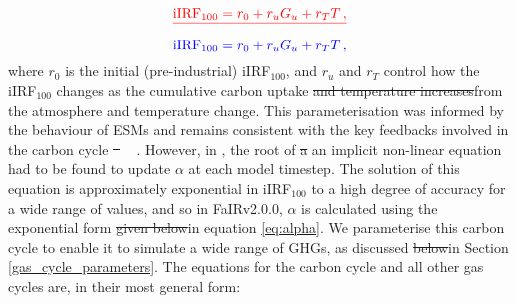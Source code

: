 \documentclass[gmd, manuscript]{copernicus}
\providecommand{\DIFadd}[1]{{\protect\color{blue}#1}} %
\providecommand{\DIFdel}[1]{{\protect\color{red}\sout{#1}}}                      %
\providecommand{\DIFaddbegin}{} %
\providecommand{\DIFaddend}{} %
\providecommand{\DIFdelbegin}{} %
\providecommand{\DIFdelend}{} %
\begin{document}
\DIFdelbegin \begin{displaymath}\DIFdel{\mathrm{iIRF_{100}} = r_0 + r_u G_u + r_T T\,,}\end{displaymath} %
\DIFdelend \DIFaddbegin \begin{equation}
    \DIFadd{\mathrm{iIRF_{100}} = r_0 + r_u G_u + r_T T\,,
}\end{equation}
\DIFaddend where $r_0$ is the initial (pre-industrial) iIRF$_{100}$, and $r_u$ and $r_T$ control how the iIRF$_{100}$ changes as the cumulative carbon uptake \DIFdelbegin \DIFdel{and temperature increases}\DIFdelend \DIFaddbegin \DIFadd{from the atmosphere and temperature change}\DIFaddend . This parameterisation was informed by the behaviour of ESMs and remains consistent with the key feedbacks involved in the carbon cycle \DIFdelbegin \DIFdel{\mbox{%
\citep{Arora2019}}\hspace{0pt}%
}\DIFdelend \DIFaddbegin \DIFadd{\mbox{%
\citep{K.Arora2020}}\hspace{0pt}%
}\DIFaddend . However, in \citet{Millar2016}, the root of \DIFdelbegin \DIFdel{a }\DIFdelend \DIFaddbegin \DIFadd{an implicit }\DIFaddend non-linear equation had to be found to update $\alpha$ at each model timestep. The solution of this equation is approximately exponential in iIRF$_{100}$ to a high degree of accuracy for a wide range of values\DIFaddbegin \DIFadd{, }\DIFaddend and so in FaIRv2.0\DIFaddbegin \DIFadd{.0}\DIFaddend , $\alpha$ is calculated using the exponential form \DIFdelbegin \DIFdel{given below}\DIFdelend \DIFaddbegin \DIFadd{in equation \ref{eq:alpha}}\DIFaddend . We parameterise this carbon cycle to enable it to simulate a wide range of GHGs, as discussed \DIFdelbegin \DIFdel{below}\DIFdelend \DIFaddbegin \DIFadd{in Section \ref{gas_cycle_parameters}}\DIFaddend . The equations for the carbon cycle and all other gas cycles are, in their most general form:\\
\DIFdelbegin %
\DIFdelend %
\end{document}
